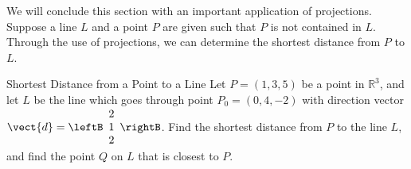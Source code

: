 We will conclude this section with an important application of projections. Suppose a line $L$ and a point $P$ are given such that $P$ is not contained in $L$. Through the use of projections, we can determine the shortest distance from $P$ to $L$. 

\begin{example}{Shortest Distance from a Point to a Line}\label{exa:shortestpointline}
Let $P = (1,3,5)$ be a point in $\mathbb{R}^3$, and let $L$ be the line which goes through point $P_0 = (0,4,-2)$ with direction vector $\vect{d} = \leftB
\begin{array}{r}
2 \\
1 \\
2
\end{array}
\rightB
$.  Find the shortest distance from $P$ to the line $L$, and find the point $Q$ on $L$ that is closest to $P$. 
\end{example}

